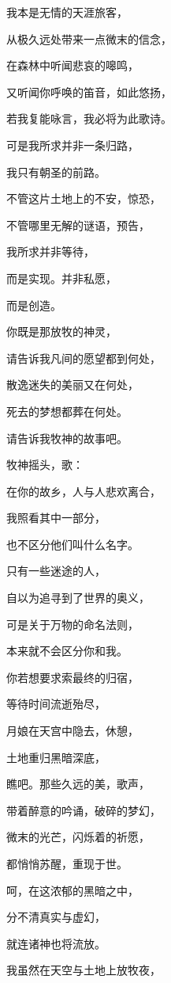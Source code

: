 \documentclass[UTF8]{article}
\begin{document}
\par 我本是无情的天涯旅客，
\par 从极久远处带来一点微末的信念，
\par 在森林中听闻悲哀的嗥鸣，
\par 又听闻你呼唤的笛音，如此悠扬，
\par 若我复能咏言，我必将为此歌诗。
\par 可是我所求并非一条归路，
\par 我只有朝圣的前路。
\par 不管这片土地上的不安，惊恐，
\par 不管哪里无解的谜语，预告，
\par 我所求并非等待，
\par 而是实现。并非私愿，
\par 而是创造。
\par 你既是那放牧的神灵，
\par 请告诉我凡间的愿望都到何处，
\par 散逸迷失的美丽又在何处，
\par 死去的梦想都葬在何处。
\par 请告诉我牧神的故事吧。
\\[0.6cm]
\par 牧神摇头，歌：
\\[0.6cm]
\par 在你的故乡，人与人悲欢离合，
\par 我照看其中一部分，
\par 也不区分他们叫什么名字。
\par 只有一些迷途的人，
\par 自以为追寻到了世界的奥义，
\par 可是关于万物的命名法则，
\par 本来就不会区分你和我。
\par 你若想要求索最终的归宿，
\par 等待时间流逝殆尽，
\par 月娘在天宫中隐去，休憩，
\par 土地重归黑暗深底，
\par 瞧吧。那些久远的美，歌声，
\par 带着醉意的吟诵，破碎的梦幻，
\par 微末的光芒，闪烁着的祈愿，
\par 都悄悄苏醒，重现于世。
\par 呵，在这浓郁的黑暗之中，
\par 分不清真实与虚幻，
\par 就连诸神也将流放。
\par 我虽然在天空与土地上放牧夜，
\end{document}
